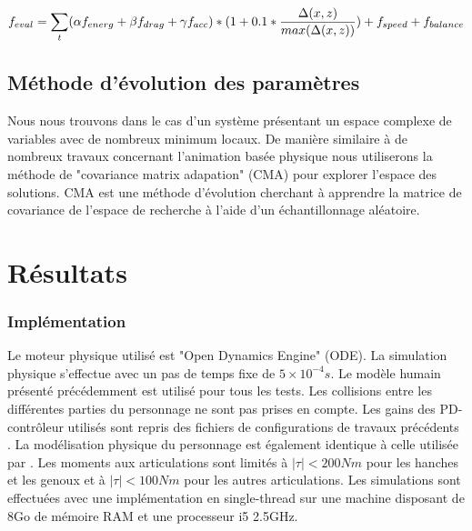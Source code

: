 \documentclass[runningheads,a4paper]{llncs}
\begin{document}
\begin{equation}
f_{eval} =\sum_{\substack{t}} (\alpha f_{energ} + \beta f_{drag} + \gamma f_{acc})*(1+0.1*\frac{\Delta(x,z)}{max(\Delta(x,z))}) \\
+ f_{speed} + f_{balance}
\label{eq:complete_eval}
\end{equation}



%
\subsection{Méthode d'évolution des paramètres}
Nous nous trouvons dans le cas d'un système présentant un espace complexe de variables avec de nombreux minimum locaux. De manière similaire à de nombreux travaux concernant l'animation basée physique \cite{geijtenbeek2012simple,tan2011articulated} nous utiliserons la méthode de "covariance matrix adapation" (CMA) \cite{hansen2006cma} pour explorer l'espace des solutions. CMA est une méthode d'évolution cherchant à apprendre la matrice de covariance de l'espace de recherche à l'aide d'un échantillonnage aléatoire.




%
\section{Résultats}
\label{sec:resultats}
%
\subsubsection{Implémentation}
Le moteur physique utilisé est "Open Dynamics Engine" (ODE). La simulation physique s'effectue avec un pas de temps fixe de $5 \times 10^{-4}s$. Le modèle humain présenté précédemment est utilisé pour tous les tests. Les collisions entre les différentes parties du personnage ne sont pas prises en compte. Les gains des PD-contrôleur utilisés sont repris des fichiers de configurations de travaux précédents \cite{coros2009robust}. La modélisation physique du personnage est également identique à celle utilisée par \cite{coros2009robust}. Les moments aux articulations sont limités à $|\tau|<200Nm$ pour les hanches et les genoux et à $|\tau|<100Nm$ pour les autres articulations.
Les simulations sont effectuées avec une implémentation en single-thread sur une machine disposant de 8Go de mémoire RAM et une processeur i5 2.5GHz.
\end{document}
